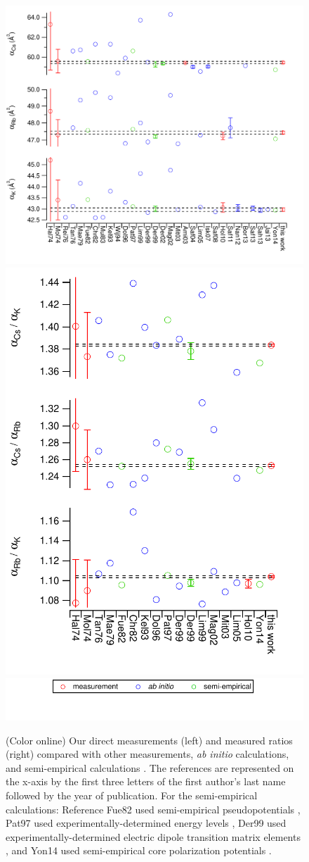 \documentclass[twocolumn,prl,showpacs,superscriptaddress,longbibliography]{revtex4-1}   %
\begin{document}
\begin{figure}
\includegraphics[width=0.60\linewidth,keepaspectratio]{displayAbsComps.pdf}
\includegraphics[width=0.38\linewidth,keepaspectratio]{displayRatComps.pdf}
\includegraphics[width=0.55\linewidth,keepaspectratio]{displayCompsLegend.pdf}
\caption{\label{comparisons}(Color online) Our direct measurements (left) and measured ratios (right) compared with other measurements, \textit{ab initio} calculations, and semi-empirical calculations 
\cite{Molof1974a,Hall1974,Tang1976,Reinsch1976,Kutzelnigg1978,
Christiansen1982,Fuentealba1999,Muller1984,Kello1993,VanWijngaarden1994,
Dolg1996,Patil1997,Derevianko1998,Magnier2002,Derevianko2001,
Amini2003,Mitroy2003,Safronova2004,Lim2005,Iskrenova-Tchoukova2007,Safronova2008,
Holmgren2010,Safronova2011,Nandy2012,Jiang2013,Sahoo2013,
Safronova2013,Borschevsky2013,Y.-B.2014}.
The references are represented on the x-axis by the first three letters of the first author's last name followed by the year of publication. For the semi-empirical calculations: Reference Fue82 used semi-empirical pseudopotentials \cite{Fuentealba1999}, Pat97 used experimentally-determined energy levels \cite{Patil1997}, Der99 used experimentally-determined electric dipole transition matrix elements \cite{Derevianko1998}, and Yon14 used semi-empirical core polarization potentials \cite{Y.-B.2014}. }
\end{figure}
\end{document}
